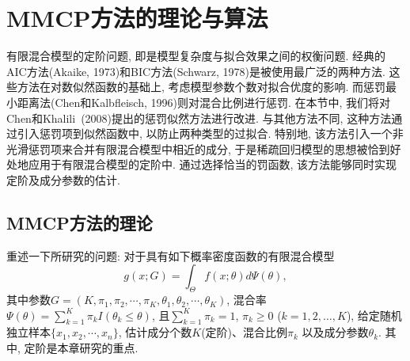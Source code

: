 \documentclass[a4paper,12pt,openany,oneside,utf-8]{ctexbook}
\begin{document}
\section{MMCP方法的理论与算法}
\label{sec:theory and algorithm to MMCP}
有限混合模型的定阶问题, 即是模型复杂度与拟合效果之间的权衡问题. 经典的AIC方法(Akaike, 1973)和BIC方法(Schwarz, 1978)是被使用最广泛的两种方法. 这些方法在对数似然函数的基础上, 考虑模型参数个数对拟合优度的影响. 而惩罚最小距离法(Chen和Kalbfleisch, 1996)则对混合比例进行惩罚. 在本节中, 我们将对Chen和Khalili~(2008)提出的惩罚似然方法进行改进. 与其他方法不同, 这种方法通过引入惩罚项到似然函数中, 以防止两种类型的过拟合. 特别地, 该方法引入一个非光滑惩罚项来合并有限混合模型中相近的成分, 于是稀疏回归模型的思想被恰到好处地应用于有限混合模型的定阶中. 通过选择恰当的罚函数, 该方法能够同时实现定阶及成分参数的估计.%


\subsection{MMCP方法的理论}
重述一下所研究的问题: 对于具有如下概率密度函数的有限混合模型
\begin{equation}
\label{equ:mixture density function for order selection}
  g(x; G)=\int_{\Theta}f(x; \theta)d\Psi(\theta),
\end{equation}
其中参数$G=(K, \pi_{1}, \pi_{2}, \cdots, \pi_{K}, \theta_{1}, \theta_{2}, \cdots, \theta_{K})$, 混合率$\Psi(\theta)=\sum_{k=1}^{K}\pi_{k}I(\theta_{k}\leq\theta)$, 且$\sum_{k=1}^{K}\pi_{k}=1$, $\pi_{k}\geq0$ ($k=1, 2, \ldots, K$), 给定随机独立样本$\{x_1, x_2, \cdots, x_n\}$, 估计成分个数$K$(定阶)、混合比例$\pi_{k}$ 以及成分参数$\theta_{k}$. 其中, 定阶是本章研究的重点.
\end{document}
